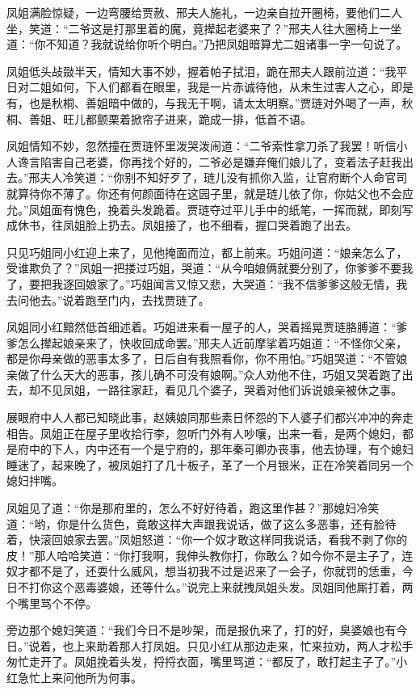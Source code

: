 \documentclass[12pt,oneside]{book}
\begin{document}
凤姐满脸惊疑，一边弯腰给贾赦、邢夫人施礼，一边亲自拉开圈椅，要他们二人坐，笑道：“二爷这是打那里着的魔，竟撵起老婆来了？”邢夫人往大圈椅上一坐道：“你不知道？我就说给你听个明白。”乃把凤姐暗算尤二姐诸事一字一句说了。

凤姐低头敁敠半天，情知大事不妙，握着帕子拭泪，跪在邢夫人跟前泣道：“我平日对二姐如何，下人们都看在眼里，我是一片赤诚待他，从未生过害人之心，即是有，也是秋桐、善姐暗中做的，与我无干啊，请太太明察。”贾琏对外喝了一声，秋桐、善姐、旺儿都颤栗着掀帘子进来，跪成一排，低首不语。

凤姐情知不妙，忽然撞在贾琏怀里泼哭泼闹道：“二爷索性拿刀杀了我罢！听信小人谗言陷害自己老婆，你再找个好的，二爷必是嫌弃俺们娘儿了，变着法子赶我出去。”邢夫人冷笑道：“你别不知好歹了，琏儿没有抓你入监，让官府断个人命官司就算待你不薄了。你还有何颜面待在这园子里，就是琏儿依了你，你姑父也不会应允。”凤姐面有愧色，挽着头发跪着。贾琏夺过平儿手中的纸笔，一挥而就，即刻写成休书，往凤姐脸上扔去。凤姐接了，也不细看，握口哭着跑了出去。

只见巧姐同小红迎上来了，见他掩面而泣，都上前来。巧姐问道：“娘亲怎么了，受谁欺负了？”凤姐一把搂过巧姐，哭道：“从今咱娘俩就要分别了，你爹爹不要我了，要把我逐回娘家了。”巧姐闻言又惊又悲，大哭道：“我不信爹爹这般无情，我去问他去。”说着跑至门内，去找贾琏了。

凤姐同小红黯然低首细述着。巧姐进来看一屋子的人，哭着摇晃贾琏胳膊道：“爹爹怎么撵起娘亲来了，快收回成命罢。”邢夫人近前摩挲着巧姐道：“不怪你父亲，都是你母亲做的恶事太多了，日后自有我照看你，你不用怕。”巧姐哭道：“不管娘亲做了什么天大的恶事，孩儿确不可没有娘啊。”众人劝他不住，巧姐又哭着跑了出去，却不见凤姐，一路往家赶，看见几个婆子，哭着对他们诉说娘亲被休之事。

展眼府中人人都已知晓此事，赵姨娘同那些素日怀怨的下人婆子们都兴冲冲的奔走相告。凤姐正在屋子里收拾行李，忽听门外有人吵嚷，出来一看，是两个媳妇，都是府中的下人，内中还有一个是宁府的，那年秦可卿办丧事，他去协理，有个媳妇睡迷了，起来晚了，被凤姐打了几十板子，革了一个月银米，正在冷笑着同另一个媳妇拌嘴。

凤姐见了道：“你是那府里的，怎么不好好待着，跑这里作甚？”那媳妇冷笑道：“哟，你是什么货色，竟敢这样大声跟我说话，做了这么多恶事，还有脸待着，快滚回娘家去罢。”凤姐怒道：“你一个奴才敢这样同我说话，看我不剥了你的皮！”那人哈哈笑道：“你打我啊，我伸头教你打，你敢么？如今你不是主子了，连奴才都不是了，还耍什么威风，想当初我不过是迟来了一会子，你就罚的恁重，今日不打你这个恶毒婆娘，还等什么。”说完上来就拽凤姐头发。凤姐同他厮打着，两个嘴里骂个不停。

旁边那个媳妇笑道：“我们今日不是吵架，而是报仇来了，打的好，臭婆娘也有今日。”说着，也上来助着那人打凤姐。只见小红从那边走来，忙来拉劝，两人才松手匆忙走开了。凤姐挽着头发，捋捋衣面，嘴里骂道：“都反了，敢打起主子了。”小红急忙上来问他所为何事。
\end{document}
